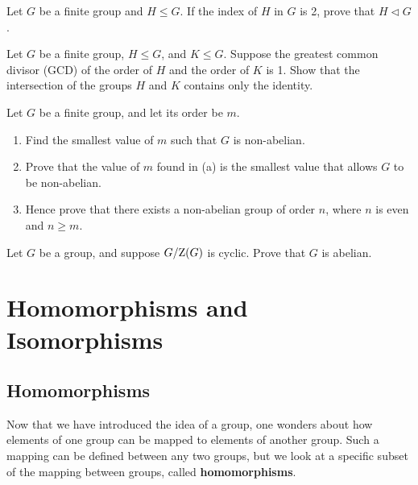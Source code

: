 \begin{problem}\label{problem-subgroup-of-index-2-is-normal}
    Let $G$ be a finite group and $H \leq G$. If the index of $H$ in $G$ is 2, prove that $H \lhd G$.
\end{problem}

\begin{problem}\label{problem-intersection-of-coprime-subgroups}
    Let $G$ be a finite group, $H \leq G$, and $K \leq G$. Suppose the greatest common divisor (GCD) of the order of $H$ and the order of $K$ is 1. Show that the intersection of the groups $H$ and $K$ contains only the identity.
\end{problem}

\begin{problem}
    Let $G$ be a finite group, and let its order be $m$.
    \begin{enumerate}[label=(\alph*)]
        \item Find the smallest value of $m$ such that $G$ is non-abelian.
        \item Prove that the value of $m$ found in (a) is the smallest value that allows $G$ to be non-abelian.
        \item Hence prove that there exists a non-abelian group of order $n$, where $n$ is even and $n \geq m$.
    \end{enumerate}
\end{problem}

\begin{problem}\label{problem-quotient-of-group-mod-center-is-cyclic-implies-abelian}
    Let $G$ be a group, and suppose $G / \mathrm{Z}(G)$ is cyclic. Prove that $G$ is abelian.
\end{problem}

\chapter{Homomorphisms and Isomorphisms}
\section{Homomorphisms}
Now that we have introduced the idea of a group, one wonders about how elements of one group can be mapped to elements of another group. Such a mapping can be defined between any two groups, but we look at a specific subset of the mapping between groups, called \textbf{homomorphisms}.


